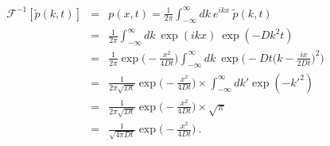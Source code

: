 \begin{eqnarray}
\mathcal{F}^{-1} [\tilde{p}(k, t)] &=& p(x,t)  = \frac{1}{2 \pi } \int_{-\infty}^{\infty} dk~e^{i k x}~\tilde{p}(k, t)  \nonumber \\
&=& \frac{1}{2 \pi } \int_{-\infty}^{\infty} dk~\exp(i k x)~ \exp(-D k^2 t) \nonumber  \\
&=& \frac{1}{2 \pi } \exp\bigg(- \frac{x^2}{4 D t} \bigg) \int_{-\infty}^{\infty} dk~\exp \Bigg(-D t \bigg(k-\frac{i x}{2 D t}\bigg) ^2\Bigg) \nonumber \\
&=& \frac{1}{2 \pi \sqrt{D t} } \exp\bigg(- \frac{x^2}{4 D t} \bigg) \times \int_{-\infty}^{\infty} dk' \exp (-k'^2 ) \nonumber \\
&=& \frac{1}{2 \pi \sqrt{D t} } \exp\bigg(- \frac{x^2}{4 D t} \bigg) \times \sqrt{\pi} \nonumber \\
&=& \boxed{\frac{1}{\sqrt{4 \pi D t} } \exp\bigg(- \frac{x^2}{4 D t}\bigg)}~.
\end{eqnarray}